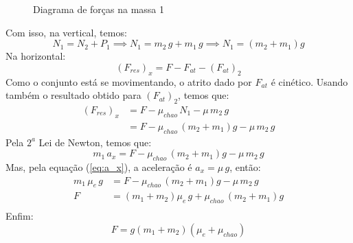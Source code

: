 \documentclass[12pt]{extarticle}
\newcommand{\<}{\langle}
\renewcommand{\>}{\rangle}
\theoremstyle{definition}
\begin{document}
\begin{figure}[H]
    \centering
    \caption{Diagrama de forças na massa 1}
    \label{fig:atrito_m_1}
\end{figure}
Com isso, na vertical, temos:
\begin{equation}
    N_1 = N_2 + P_1 \implies N_1 = m_2\,g + m_1\,g \implies \boxed{N_1= (m_2+m_1)g}
\end{equation}
Na horizontal:
\begin{equation}
    (F_{res})_x = F - F_{at} - \left(F_{at}\right)_2
\end{equation}
Como o conjunto está se movimentando, o atrito dado por $F_{at}$ é cinético. Usando também o resultado obtido para $\left(F_{at}\right)_2$, temos que:
\begin{equation}
    \begin{split}
        (F_{res})_x &= F - \mu_{chao}\,N_1 - \mu\,m_2\,g\\
        &=F - \mu_{chao}\,(m_2+m_1)g - \mu\,m_2\,g
    \end{split}
\end{equation}
Pela $2^a$ Lei de Newton, temos que:
\begin{equation}
    m_1\,a_x = F - \mu_{chao}\,(m_2+m_1)g - \mu\,m_2\,g
\end{equation}
Mas, pela equação (\ref{eq:a_x}), a aceleração é $a_x = \mu\,g$, então:
\begin{equation}
    \begin{split}
        m_1\,\mu_e\,g &= F - \mu_{chao}\,(m_2+m_1)g - \mu\,m_2\,g\\
        F &= (m_1+m_2)\mu_e\,g + \mu_{chao}\,(m_2+m_1)g\\
    \end{split}
\end{equation}
Enfim:
\begin{equation}
    \boxed{F = g(m_1+m_2)(\mu_e+\mu_{chao})}
\end{equation}
\end{document}
